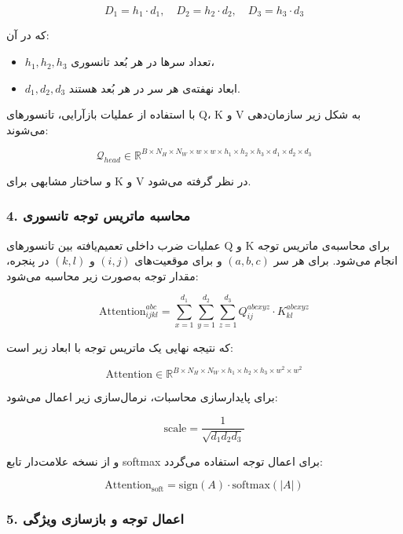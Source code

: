 \[
D_1 = h_1 \cdot d_1, \quad D_2 = h_2 \cdot d_2, \quad D_3 = h_3 \cdot d_3
\]

که در آن:
\begin{itemize}
	\item $h_1, h_2, h_3$ تعداد سرها در هر بُعد تانسوری،
	\item $d_1, d_2, d_3$ ابعاد نهفته‌ی هر سر در هر بُعد هستند.
\end{itemize}

با استفاده از عملیات بازآرایی، تانسورهای Q، K و V به شکل زیر سازمان‌دهی می‌شوند:

\[
\mathcal{Q}_{head} \in \mathbb{R}^{B \times N_H \times N_W \times w \times w \times h_1 \times h_2 \times h_3 \times d_1 \times d_2 \times d_3}
\]

و ساختار مشابهی برای K و V در نظر گرفته می‌شود.

\subsubsection*{4. محاسبه ماتریس توجه تانسوری}

عملیات ضرب داخلی تعمیم‌یافته بین تانسورهای Q و K برای محاسبه‌ی ماتریس توجه انجام می‌شود. برای هر سر $(a,b,c)$ و برای موقعیت‌های $(i,j)$ و $(k,l)$ در پنجره، مقدار توجه به‌صورت زیر محاسبه می‌شود:

\begin{equation}
	\text{Attention}_{ijkl}^{abc} = \sum_{x=1}^{d_1} \sum_{y=1}^{d_2} \sum_{z=1}^{d_3} 
	Q_{ij}^{abcxyz} \cdot K_{kl}^{abcxyz}
\end{equation}


که نتیجه نهایی یک ماتریس توجه با ابعاد زیر است:

\[
\text{Attention} \in \mathbb{R}^{B \times N_H \times N_W \times h_1 \times h_2 \times h_3 \times w^2 \times w^2}
\]

برای پایدارسازی محاسبات، نرمال‌سازی زیر اعمال می‌شود:

\begin{equation}
	\text{scale} = \frac{1}{\sqrt{d_1 d_2 d_3}}
\end{equation}


و از نسخه علامت‌دار تابع softmax برای اعمال توجه استفاده می‌گردد:

\begin{equation}
	\text{Attention}_{\text{soft}} = \text{sign}(A) \cdot \text{softmax}(|A|)
\end{equation}


\subsubsection*{5. اعمال توجه و بازسازی ویژگی}

